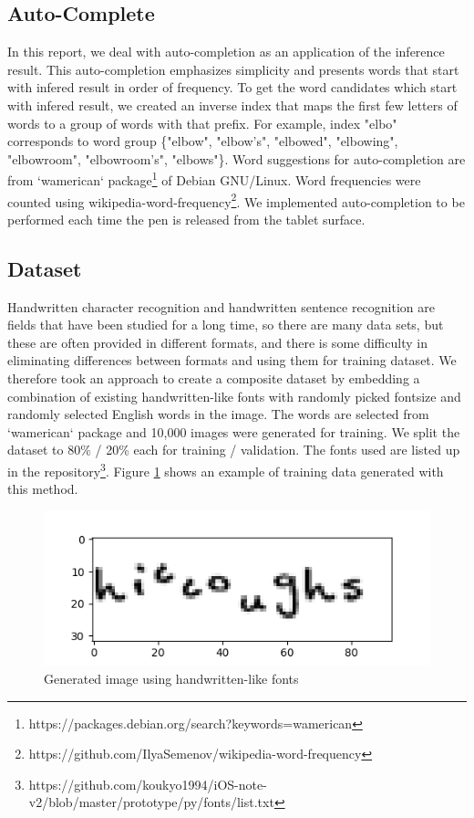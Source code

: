 \subsection{Auto-Complete}

In this report, we deal with auto-completion as an application of the inference result.
This auto-completion emphasizes simplicity and presents words
that start with infered result in order of frequency. To get the word candidates
which start with infered result, we created an inverse index
that maps the first few letters of words to a group of words with that prefix.
For example, index "elbo" corresponds to word group \{"elbow", "elbow's", "elbowed", "elbowing", "elbowroom", "elbowroom's", "elbows"\}.
Word suggestions for auto-completion are from `wamerican` package\footnote{https://packages.debian.org/search?keywords=wamerican} of Debian GNU/Linux.
Word frequencies were counted using wikipedia-word-frequency\footnote{https://github.com/IlyaSemenov/wikipedia-word-frequency}.
We implemented auto-completion to be performed each time the pen is released from the tablet surface.

\subsection{Dataset}

Handwritten character recognition and handwritten sentence recognition are
fields that have been studied for a long time, so there are many data sets,
but these are often provided in different formats, and there is some difficulty
in eliminating differences between formats and using them for training dataset.
We therefore took an approach to create a composite dataset by
embedding a combination of existing handwritten-like fonts with randomly picked fontsize and
randomly selected English words in the image. The words are selected from `wamerican` package
and 10,000 images were generated for training. We split the dataset to 80\% / 20\% each for training / validation.
The fonts used are listed up in the repository\footnote{https://github.com/koukyo1994/iOS-note-v2/blob/master/prototype/py/fonts/list.txt}.
Figure \ref{fig:generated_image} shows an example of training data generated with this method.

\begin{figure}
    \centering
    \includegraphics[width=\linewidth]{images/generated_image.png}
    \caption{Generated image using handwritten-like fonts}
    \label{fig:generated_image}
\end{figure}

